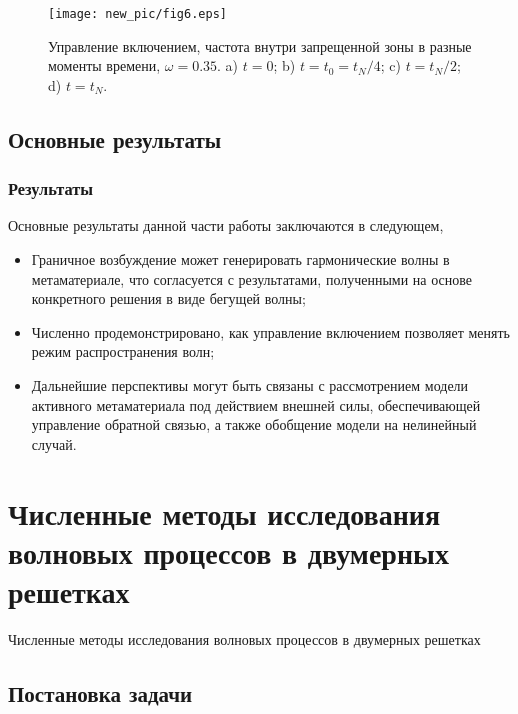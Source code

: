 \begin{frame}
	\begin{figure}
		\begin{center}
			\texttt{[image: new\_pic/fig6.eps]}
		\end{center}
		Управление включением, частота внутри запрещенной зоны в разные моменты времени, $\omega = 0.35$.  a) $t=0$; b) $ t=t_0=t_N/4$; c) $t=t_N/2$; d) $t=t_N$.
	\end{figure}
\end{frame}

\subsection{Основные результаты}
\begin{frame}
	\frametitle{Результаты}
	Основные результаты данной части работы заключаются в следующем,
	\begin{itemize}
		\item{Граничное возбуждение может генерировать гармонические волны в метаматериале, что согласуется с результатами, полученными на основе конкретного решения в виде бегущей волны;}
		\item{Численно продемонстрировано, как управление включением позволяет менять режим распространения волн;}
		\item{Дальнейшие перспективы могут быть связаны с рассмотрением модели активного метаматериала под действием внешней силы, обеспечивающей управление обратной связью, а также обобщение модели на нелинейный случай.}
	\end{itemize}
\end{frame}

\section{Численные методы исследования волновых процессов в двумерных решетках}

\begin{frame}
	\begin{center}
		\Large
		Численные методы исследования волновых процессов в двумерных решетках
	\end{center}
\end{frame}

\subsection{Постановка задачи}


